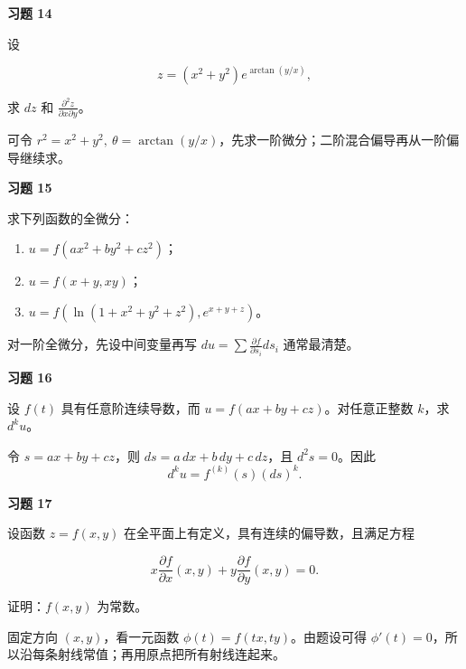 \begin{exercisebox}
\textbf{习题 14}

设

\[
        z=(x^2+y^2)e^{\arctan(y/x)},
      \]

求 \(dz\) 和 \(\frac{\partial^2 z}{\partial x\partial y}\)。

\begin{hintbox}
可令 \(r^2=x^2+y^2,\ \theta=\arctan(y/x)\)，先求一阶微分；二阶混合偏导再从一阶偏导继续求。
\end{hintbox}
\end{exercisebox}

\begin{exercisebox}
\textbf{习题 15}

求下列函数的全微分：

\begin{enumerate}
 \item \(u=f(ax^2+by^2+cz^2)\)；
 \item \(u=f(x+y,xy)\)；
 \item \(u=f(\ln(1+x^2+y^2+z^2),e^{x+y+z})\)。
 \end{enumerate}

\begin{hintbox}
对一阶全微分，先设中间变量再写 \(du=\sum \frac{\partial f}{\partial s_i}ds_i\) 通常最清楚。
\end{hintbox}
\end{exercisebox}

\begin{exercisebox}
\textbf{习题 16}

设 \(f(t)\) 具有任意阶连续导数，而 \(u=f(ax+by+cz)\)。对任意正整数 \(k\)，求 \(d^ku\)。

\begin{hintbox}
令 \(s=ax+by+cz\)，则 \(ds=a\,dx+b\,dy+c\,dz\)，且 \(d^2s=0\)。因此 \[
          d^ku=f^{(k)}(s)(ds)^k.
        \]
\end{hintbox}
\end{exercisebox}

\begin{exercisebox}
\textbf{习题 17}

设函数 \(z=f(x,y)\) 在全平面上有定义，具有连续的偏导数，且满足方程

\[
        x\frac{\partial f}{\partial x}(x,y)
        +
        y\frac{\partial f}{\partial y}(x,y)=0.
      \]

证明：\(f(x,y)\) 为常数。

\begin{hintbox}
固定方向 \((x,y)\)，看一元函数 \(\phi(t)=f(tx,ty)\)。由题设可得 \(\phi'(t)=0\)，所以沿每条射线常值；再用原点把所有射线连起来。
\end{hintbox}
\end{exercisebox}

